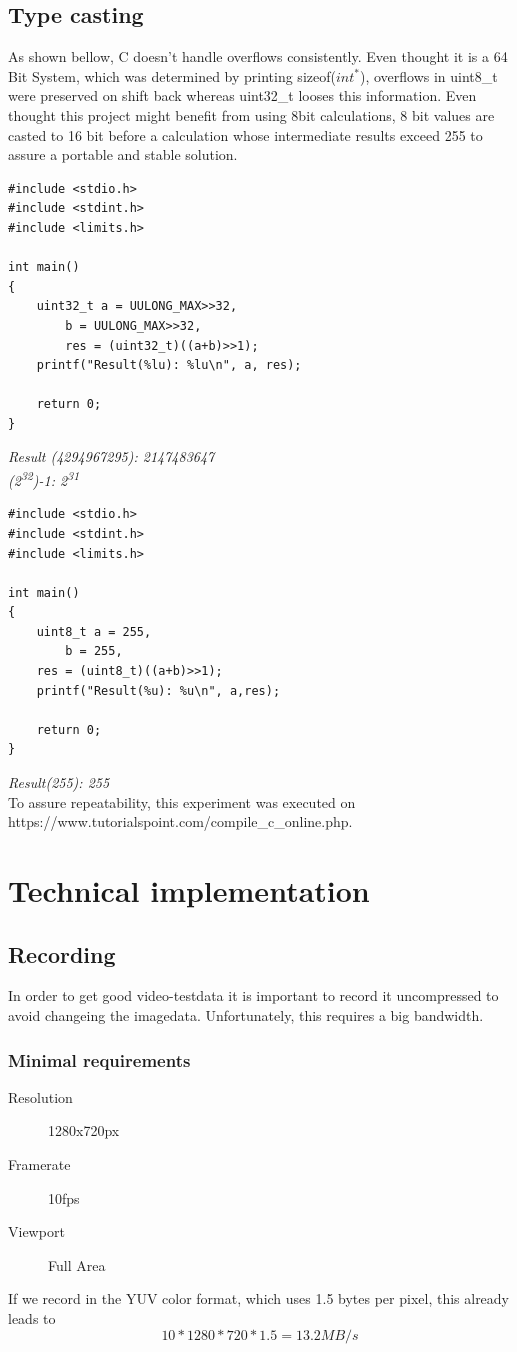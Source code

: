 \section{Type casting}
As shown bellow, C doesn't handle overflows consistently. Even thought it is a 64 Bit System, which was determined by printing sizeof($int^*$), overflows in uint8\_t were preserved on shift back whereas uint32\_t looses this information. Even thought this project might benefit from using 8bit calculations, 8 bit values are casted to 16 bit before a calculation whose intermediate results exceed 255 to assure a portable and stable solution.

\begin{verbatim}
#include <stdio.h>
#include <stdint.h>
#include <limits.h>

int main()
{
	uint32_t a = UULONG_MAX>>32,
		b = UULONG_MAX>>32,
		res = (uint32_t)((a+b)>>1);
	printf("Result(%lu): %lu\n", a, res);
	
	return 0;
}
\end{verbatim}
\textit{ Result (4294967295): 2147483647 \\
	(2\textsuperscript{32})-1: 2\textsuperscript{31}
}
\begin{verbatim}
#include <stdio.h>
#include <stdint.h>
#include <limits.h>

int main()
{
	uint8_t a = 255,
		b = 255,
	res = (uint8_t)((a+b)>>1);
	printf("Result(%u): %u\n", a,res);
	
	return 0;
}

\end{verbatim}
\textit{ Result(255): 255 } \\
To assure repeatability, this experiment was executed on \\ https://www.tutorialspoint.com/compile\_c\_online.php.


\chapter {Technical implementation}
\section{Recording}
In order to get good video-testdata it is important to record it uncompressed to avoid changeing the imagedata. Unfortunately, this requires a big bandwidth.

\subsection{Minimal requirements}
\begin{description}
	\item[Resolution] 1280x720px
	\item[Framerate] 10fps
	\item[Viewport] Full Area
\end{description}
If we record in the YUV color format, which uses 1.5 bytes per pixel, this already leads to 
$$10 * 1280 * 720 * 1.5 = 13.2 MB/s$$

